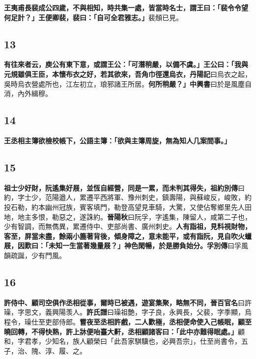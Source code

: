\textbf{王夷甫長裴成公四歲，不與相知，時共集一處，皆當時名士，謂王曰：「裴令令望何足計？」王便卿裴，裴曰：「自可全君雅志。」}{\footnotesize 裴頠已見。}

\subsection*{13}

\textbf{有往來者云，庾公有東下意，或謂王公：「可潛稍嚴，以備不虞。」王公曰：「我與元規雖俱王臣，本懷布衣之好，若其欲來，吾角巾徑還烏衣，}{\footnotesize \textbf{丹陽記}曰烏衣之起，吳時烏衣營處所也，江左初立，琅邪諸王所居。}\textbf{何所稍嚴？」}{\footnotesize \textbf{中興書}曰於是風塵自消，內外緝穆。}

\subsection*{14}

\textbf{王丞相主簿欲檢校帳下，公語主簿：「欲與主簿周旋，無為知人几案間事。」}

\subsection*{15}

\textbf{祖士少好財，阮遙集好屐，並恆自經營，同是一累，而未判其得失，}{\footnotesize \textbf{祖約別傳}曰約，字士少，范陽遒人，累遷平西將軍、豫州刺史，鎮壽陽，與蘇峻反，峻敗，約投石勒，約本幽州冠族，賓客填門，勒登高望見車騎，大驚，又使佔奪鄉里先人田地，地主多恨，勒惡之，遂誅約。\textbf{晉陽秋}曰阮孚，字遙集，陳留人，咸第二子也，少有智調，而無儁異，累遷侍中、吏部尚書、廣州刺史。}\textbf{人有詣祖，見料視財物，客至，屏當未盡，餘兩小簏著背後，傾身障之，意未能平，或有詣阮，見自吹火蠟屐，因歎曰：「未知一生當著幾量屐？」神色閑暢，於是勝負始分。}{\footnotesize \textbf{孚別傳}曰孚風韻疏誕，少有門風。}

\subsection*{16}

\textbf{許侍中、顧司空俱作丞相從事，爾時已被遇，遊宴集聚，略無不同，}{\footnotesize \textbf{晉百官名}曰許璪，字思文，義興陽羡人。\textbf{許氏譜}曰璪祖艶，字子良，永興長，父裴，字季顯，烏程令，璪仕至吏部侍郎。}\textbf{嘗夜至丞相許戲，二人歡極，丞相便命使入己帳眠，顧至曉回轉，不得快熟，許上牀便咍臺大鼾，丞相顧諸客曰：「此中亦難得眠處。」}{\footnotesize 顧和，字君孝，少知名，族人顧榮曰「此吾家騏驥也，必興吾宗」，仕至尚書令，五子，治、隗、淳、履、之。}

